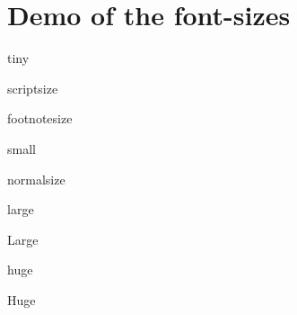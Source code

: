 \documentclass{article}
\begin{document}
\section*{Demo of the font-sizes}
 
{\tiny tiny}

{\scriptsize scriptsize}

{\footnotesize footnotesize}

{\small small}

{\normalsize normalsize}

{\large large}

{\Large Large}

{\huge huge}

{\Huge Huge}
	
\end{document}
